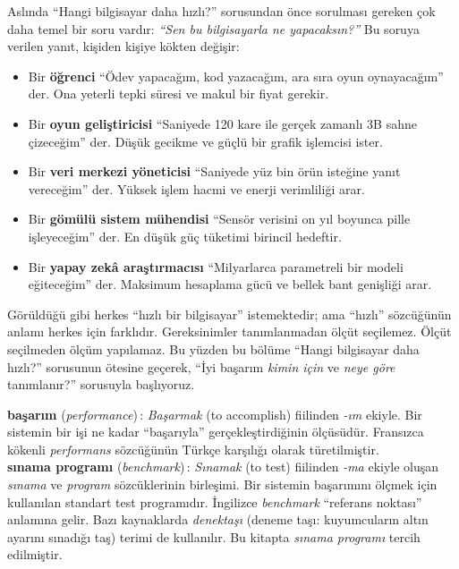 Aslında ``Hangi bilgisayar daha hızlı?'' sorusundan önce sorulması gereken çok daha temel bir soru vardır: \emph{``Sen bu bilgisayarla ne yapacaksın?''} Bu soruya verilen yanıt, kişiden kişiye kökten değişir:
\begin{itemize}[nosep]
    \item Bir \textbf{öğrenci} ``Ödev yapacağım, kod yazacağım, ara sıra oyun oynayacağım'' der. Ona yeterli tepki süresi ve makul bir fiyat gerekir.
    \item Bir \textbf{oyun geliştiricisi} ``Saniyede 120 kare ile gerçek zamanlı 3B sahne çizeceğim'' der. Düşük gecikme ve güçlü bir grafik işlemcisi ister.
    \item Bir \textbf{veri merkezi yöneticisi} ``Saniyede yüz bin örün isteğine yanıt vereceğim'' der. Yüksek işlem hacmi ve enerji verimliliği arar.
    \item Bir \textbf{gömülü sistem mühendisi} ``Sensör verisini on yıl boyunca pille işleyeceğim'' der. En düşük güç tüketimi birincil hedeftir.
    \item Bir \textbf{yapay zekâ araştırmacısı} ``Milyarlarca parametreli bir modeli eğiteceğim'' der. Maksimum hesaplama gücü ve bellek bant genişliği arar.
\end{itemize}
Görüldüğü gibi herkes ``hızlı bir bilgisayar'' istemektedir; ama ``hızlı'' sözcüğünün anlamı herkes için farklıdır. Gereksinimler tanımlanmadan ölçüt seçilemez. Ölçüt seçilmeden ölçüm yapılamaz. Bu yüzden bu bölüme ``Hangi bilgisayar daha hızlı?'' sorusunun ötesine geçerek, ``İyi başarım \emph{kimin için} ve \emph{neye göre} tanımlanır?'' sorusuyla başlıyoruz.

\begin{terimnotu}
\textbf{başarım} (\emph{performance})\,: \emph{Başarmak} (to accomplish) fiilinden \emph{-ım} ekiyle. Bir sistemin bir işi ne kadar ``başarıyla'' gerçekleştirdiğinin ölçüsüdür. Fransızca kökenli \emph{performans} sözcüğünün Türkçe karşılığı olarak türetilmiştir.\\[4pt]
\textbf{sınama programı} (\emph{benchmark})\,: \emph{Sınamak} (to test) fiilinden \emph{-ma} ekiyle oluşan \emph{sınama} ve \emph{program} sözcüklerinin birleşimi. Bir sistemin başarımını ölçmek için kullanılan standart test programıdır. İngilizce \emph{benchmark} ``referans noktası'' anlamına gelir. Bazı kaynaklarda \emph{denektaşı} (deneme taşı: kuyumcuların altın ayarını sınadığı taş) terimi de kullanılır. Bu kitapta \emph{sınama programı} tercih edilmiştir.
\end{terimnotu}

